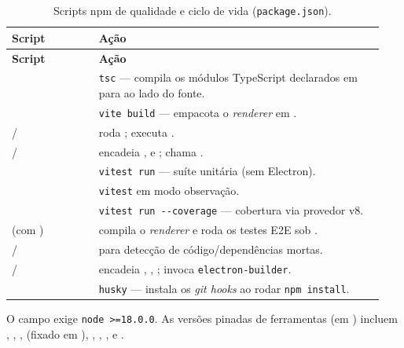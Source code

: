 \begin{longtable}{P{0.22\linewidth} Q{0.72\linewidth}}
  \caption{Scripts npm de qualidade e ciclo de vida (\texttt{package.json}).}
  \label{tab:18-npm-scripts}\\
  \toprule
  \textbf{Script} & \textbf{Ação} \\
  \midrule
  \endfirsthead
  \toprule
  \textbf{Script} & \textbf{Ação} \\
  \midrule
  \endhead
  \bottomrule
  \endfoot
        & \lstinline|tsc| --- compila os módulos TypeScript declarados em  para  ao lado do fonte. \\
  & \lstinline|vite build| --- empacota o \emph{renderer} em . \\
   /  &  roda ;  executa . \\
   /  &  encadeia ,  e ;  chama . \\
            & \lstinline|vitest run| --- suíte unitária (sem Electron). \\
      & \lstinline|vitest| em modo observação. \\
   & \lstinline|vitest run --coverage| --- cobertura via provedor v8. \\
   (com ) & compila o \emph{renderer} e roda os testes E2E sob . \\
   /  &  para detecção de código/dependências mortas. \\
   /  &  encadeia , , ;  invoca \lstinline|electron-builder|. \\
         & \lstinline|husky| --- instala os \emph{git hooks} ao rodar \lstinline|npm install|. \\
\end{longtable}

O campo  exige \lstinline|node >=18.0.0|. As versões pinadas de
ferramentas (em ) incluem , ,
,  (fixado em ), ,
, ,  e .

